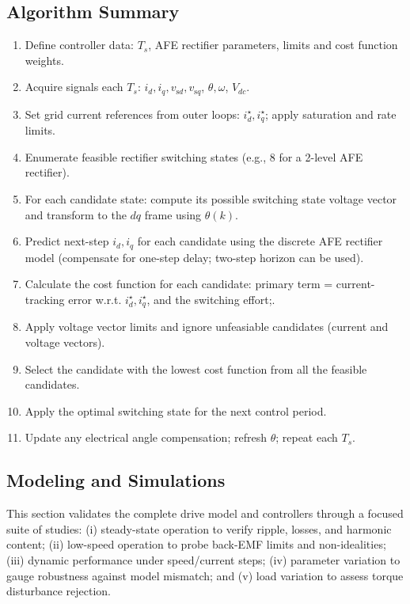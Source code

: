 \subsection{Algorithm Summary}
\begin{enumerate}
  \item Define controller data: \(T_s\), AFE rectifier parameters, limits and cost function weights.
  \item Acquire signals each \(T_s\): \(i_d,i_q,v_{\mathrm{s}d},v_{\mathrm{s}q}\), \(\theta,\omega\), \(V_{dc}\).
  \item Set grid current references from outer loops: \(i_d^\star, i_q^\star\); apply saturation and rate limits.
  \item Enumerate feasible rectifier switching states (e.g., 8 for a 2-level AFE rectifier).
  \item For each candidate state: compute its possible switching state voltage vector and transform to the \(dq\) frame using \(\theta(k)\).
  \item Predict next-step \(i_d,i_q\) for each candidate using the discrete AFE rectifier model (compensate for one-step delay; two-step horizon can be used).
  \item Calculate the cost function for each candidate:
        primary term = current-tracking error w.r.t. \(i_d^\star,i_q^\star\), and the switching effort;.
  \item Apply voltage vector limits and ignore unfeasiable candidates (current and voltage vectors).
  \item Select the candidate with the lowest cost function from all the feasible candidates.
  \item Apply the optimal switching state for the next control period.
  \item Update any electrical angle compensation; refresh \(\theta\); repeat each \(T_s\).
\end{enumerate}


\subsection{Modeling and Simulations}
This section validates the complete drive model and controllers through a focused suite of studies: (i) steady-state operation to verify ripple, losses, and harmonic content; (ii) low-speed operation to probe back-EMF limits and non-idealities; (iii)  dynamic performance under speed/current steps; (iv) parameter variation to gauge robustness against model mismatch; and (v) load variation to assess torque disturbance rejection.
